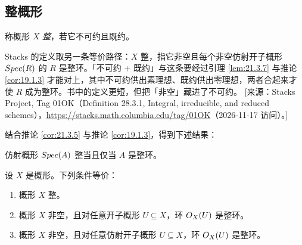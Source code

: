 \subsection{整概形}\label{sec:21.4}

\begin{definition}\label{def:21.4.1}
称概形 $X$ \emph{整}，若它不可约且既约。
\end{definition}

\begin{yizhu}
Stacks 的定义取另一条等价路径：$X$ 整，指它非空且每个非空仿射开子概形 $Spec(R)$ 的 $R$ 是整环。「不可约 + 既约」与这条要经过引理 \ref{lem:21.3.7} 与推论 \ref{cor:19.1.3} 才能对上，其中不可约供出素理想、既约供出零理想，两者合起来才使 $R$ 成为整环。书中的定义更短，但把「非空」藏进了不可约。
[来源：Stacks Project, Tag 01OK（Definition 28.3.1, Integral, irreducible, and reduced schemes），\url{https://stacks.math.columbia.edu/tag/01OK}（2026-11-17 访问）。]
\end{yizhu}

结合推论 \ref{cor:21.3.5} 与推论 \ref{cor:19.1.3}，得到下述结果：

\begin{corollary}\label{cor:21.4.2}
仿射概形 $Spec(A)$ 整当且仅当 $A$ 是整环。
\end{corollary}

\begin{exercise}\label{exc:21.4.3}
设 $X$ 是概形。下列条件等价：
\begin{enumerate}[label=(\roman*),leftmargin=2em,itemsep=0.25ex]
  \item 概形 $X$ 整。
  \item 概形 $X$ 非空，且对任意开子概形 $U\subseteq X$，环 $O_X(U)$ 是整环。
  \item 概形 $X$ 非空，且对任意仿射开子概形 $U\subseteq X$，环 $O_X(U)$ 是整环。
\end{enumerate}
\end{exercise}
